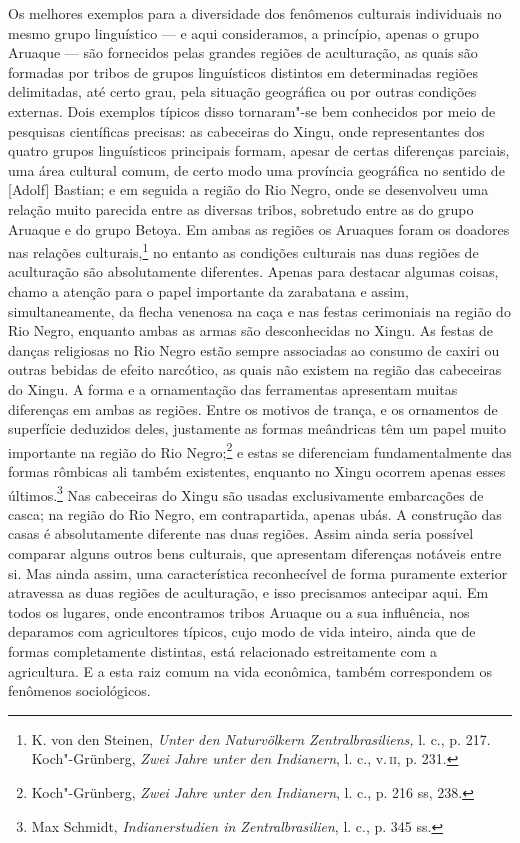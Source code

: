 Os melhores exemplos para a diversidade dos fenômenos culturais
individuais no mesmo grupo linguístico --- e aqui consideramos, a
princípio, apenas o grupo Aruaque --- são fornecidos pelas grandes
regiões de aculturação, as quais são formadas por tribos de grupos
linguísticos distintos em determinadas regiões delimitadas, até certo
grau, pela situação geográfica ou por outras condições externas. Dois
exemplos típicos disso tornaram"-se bem conhecidos por meio de pesquisas
científicas precisas: as cabeceiras do Xingu, onde representantes dos
quatro grupos linguísticos principais formam, apesar de certas
diferenças parciais, uma área cultural comum, de certo modo uma
província geográfica no sentido de {[}Adolf{]} Bastian; e em seguida a
região do Rio Negro, onde se desenvolveu uma relação muito parecida
entre as diversas tribos, sobretudo entre as do grupo Aruaque e do grupo
Betoya. Em ambas as regiões os Aruaques foram os doadores nas relações
culturais,\footnote{K. von den Steinen, \emph{Unter den Naturvölkern
  Zentralbrasiliens,} l. c., p. 217. Koch"-Grünberg, \emph{Zwei Jahre
  unter den Indianern}, l. c., v.\,\textsc{ii}, p. 231.} no entanto as condições
culturais nas duas regiões de aculturação são absolutamente diferentes.
Apenas para destacar algumas coisas, chamo a atenção para o papel
importante da zarabatana e assim, simultaneamente, da flecha venenosa na
caça e nas festas cerimoniais na região do Rio Negro, enquanto ambas as
armas são desconhecidas no Xingu. As festas de danças religiosas no Rio
Negro estão sempre associadas ao consumo de caxiri ou outras bebidas de
efeito narcótico, as quais não existem na região das cabeceiras do
Xingu. A forma e a ornamentação das ferramentas apresentam muitas
diferenças em ambas as regiões. Entre os motivos de trança, e os
ornamentos de superfície deduzidos deles, justamente as formas
meândricas têm um papel muito importante na região do Rio
Negro;\footnote{Koch"-Grünberg, \emph{Zwei Jahre unter den Indianern}, l.
  c., p. 216 ss, 238.} e estas se diferenciam fundamentalmente das
formas rômbicas ali também existentes, enquanto no Xingu ocorrem apenas
esses últimos.\footnote{Max Schmidt, \emph{Indianerstudien in
  Zentralbrasilien}, l. c., p. 345 ss.} Nas cabeceiras do Xingu são
usadas exclusivamente embarcações de casca; na região do Rio Negro, em
contrapartida, apenas ubás. A construção das casas é absolutamente
diferente nas duas regiões. Assim ainda seria possível comparar alguns
outros bens culturais, que apresentam diferenças notáveis entre si. Mas
ainda assim, uma característica reconhecível de forma puramente exterior
atravessa as duas regiões de aculturação, e isso precisamos antecipar
aqui. Em todos os lugares, onde encontramos tribos Aruaque ou a sua
influência, nos deparamos com agricultores típicos, cujo modo de vida
inteiro, ainda que de formas completamente distintas, está relacionado
estreitamente com a agricultura. E a esta raiz comum na vida econômica,
também correspondem os fenômenos sociológicos.

